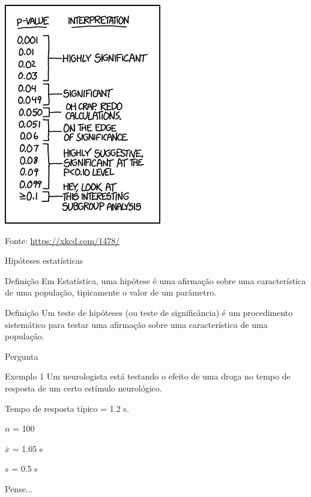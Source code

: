 \documentclass{beamer}
\begin{document}
\begin{frame}
  \begin{center}
    \includegraphics[height=.9\textheight]{Cap10-11/xkcd-p_values}

    \scriptsize
    \vfill
    \hfill Fonte: \url{https://xkcd.com/1478/}
  \end{center}
\end{frame}

\begin{frame}{\scriptsize Hipóteses estatísticas}
  \begin{block}{Definição}
    \footnotesize
    Em Estatística, uma \alert{hipótese} é uma afirmação sobre uma
    característica de uma população, tipicamente o valor de um
    parâmetro.
  \end{block}
  \begin{block}{Definição}
    \footnotesize
    Um \alert{teste de hipóteses} (ou teste de significância) é um
    procedimento sistemático para testar uma afirmação sobre uma
    característica de uma população.
  \end{block}
\end{frame}

\begin{frame}{\scriptsize Pergunta}
  \begin{exampleblock}{Exemplo 1}
    \footnotesize
    Um neurologista está testando o efeito de uma droga no tempo de
    resposta de um certo estímulo neurológico.

    \smallskip
    Tempo de resposta típico = \alert{1.2 s}.

    \smallskip
    $n$ = \alert{100}

    $\bar{x}$ = \alert{1.05 s}

    $s$ = \alert{0.5 s}
  \end{exampleblock}
  \begin{block}{Pense...}
    \footnotesize

    \bigskip
  \end{block}
\end{frame}
\end{document}
